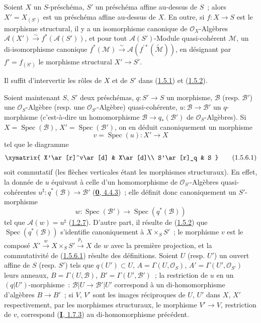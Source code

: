 \begin{corollary}[1.5.5]
\label{II.1.5.5-fr}
Soient $X$ un $S$-préschéma, $S'$ un préschéma affine au-dessus de $S$~; alors
$X'=X_{(S')}$ est un préschéma affine au-dessus de $X$. En outre, si
$f:X\to S$ est le morphisme structural, il y a un isomorphisme canonique de
$\mathcal{O}_X$-Algèbres
$\mathcal{A}(X')\xrightarrow{\sim}f^*(\mathcal{A}(S'))$, et pour tout
$\mathcal{A}(S')$-Module quasi-cohérent $\mathcal{M}$, un di-isomorphisme
canonique
$f^*(\mathcal{M})\xrightarrow{\sim}
\mathcal{A}(f^{\prime*}(\widetilde{\mathcal{M}}))$, en désignant par
$f'=f_{(S')}$ le morphisme structural $X'\to S'$.
\end{corollary}

Il suffit d'intervertir les rôles de $X$ et de $S'$ dans
(\hyperref[II.1.5.1-fr]{1.5.1}) et
(\hyperref[II.1.5.2-fr]{1.5.2}).

\begin{env}[1.5.6]
\label{II.1.5.6-fr}
Soient maintenant $S$, $S'$ deux préschémas, $q:S'\to S$ un morphisme,
$\mathcal{B}$ (resp. $\mathcal{B}'$) une $\mathcal{O}_S$-Algèbre (resp. une
$\mathcal{O}_{S'}$-Algèbre) quasi-cohérente, $u:\mathcal{B}\to\mathcal{B}'$
un $q$-morphisme (c'est-à-dire un homomorphisme
$\mathcal{B}\to q_*(\mathcal{B}')$ de $\mathcal{O}_S$-Algèbres). Si
$X=\operatorname{Spec}(\mathcal{B})$,
$X'=\operatorname{Spec}(\mathcal{B}')$, on en déduit canoniquement un
morphisme
\[
  v=\operatorname{Spec}(u):X'\to X
\]
tel que le diagramme
\[
  \xymatrix{
    X'\ar[r]^v\ar[d] & X\ar[d]\\
    S'\ar[r]_q & S
  }
  \tag{1.5.6.1}\label{II.1.5.6.1-fr}
\]
soit commutatif (les flèches verticales étant les morphismes structuraux). En
effet, la donnée de $u$ équivaut à celle d'un homomorphisme de
$\mathcal{O}_{S'}$-Algèbres quasi-cohérentes
$u^\sharp:q^*(\mathcal{B})\to\mathcal{B}'$
(\hyperref[0.4.4.3-fr]{\textbf{0}, 4.4.3})~; elle définit donc canoniquement un
$S'$-morphisme
\[
  w:\operatorname{Spec}(\mathcal{B}')\to
  \operatorname{Spec}(q^*(\mathcal{B}))
\]
tel que $\mathcal{A}(w)=u^\sharp$
(\hyperref[II.1.2.7-fr]{1.2.7}). D'autre part, il résulte de
(\hyperref[II.1.5.2-fr]{1.5.2}) que
$\operatorname{Spec}(q^*(\mathcal{B}))$ s'identifie canoniquement à
$X\times_S S'$~; le morphisme $v$ est le composé
$X'\xrightarrow{w}X\times_S S'\xrightarrow{p_1}X$ de $w$ avec la première
projection, et la commutativité de
(\hyperref[II.1.5.6.1-fr]{1.5.6.1}) résulte des définitions. Soient $U$ (resp.
$U'$) un ouvert affine de $S$ (resp. $S'$) tels que $q(U')\subset U$,
$A=\Gamma(U,\mathcal{O}_S)$, $A'=\Gamma(U',\mathcal{O}_{S'})$ leurs anneaux,
$B=\Gamma(U,\mathcal{B})$, $B'=\Gamma(U',\mathcal{B}')$~; la restriction de
$u$ en un $(q|U')$-morphisme~:
$\mathcal{B}|U\to\mathcal{B}'|U'$ correspond à un di-homomorphisme d'algèbres
$B\to B'$~; si $V$, $V'$ sont les images réciproques de $U$, $U'$ dans $X$,
$X'$ respectivement, par les morphismes structuraux, le morphisme $V'\to V$,
restriction de $v$, correspond (\hyperref[I.1.7.3-fr]{\textbf{I}, 1.7.3}) au
di-homomorphisme précédent.
\end{env}

